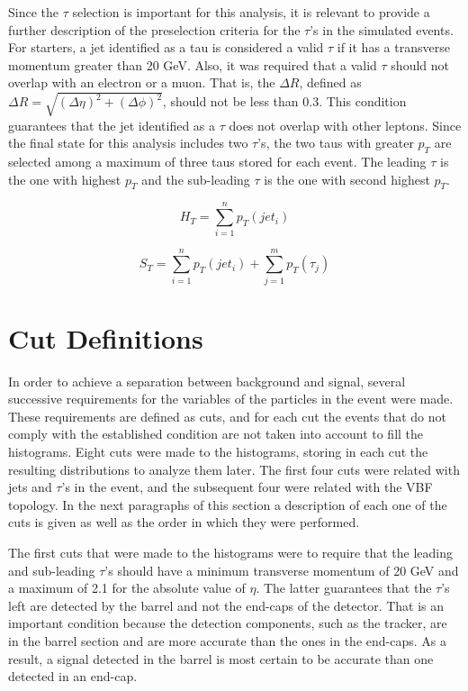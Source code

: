 Since the $\tau$ selection is important for this analysis, it is relevant to provide a further description of the preselection criteria for the $\tau$'s in the simulated events. For starters, a jet identified as a tau is considered a valid $\tau$ if it has a transverse momentum greater than 20 GeV. Also, it was required that a valid $\tau$ should not overlap with an electron or a muon. That is, the $\Delta R$, defined as $\Delta R = \sqrt{(\Delta \eta)^2 + (\Delta \phi)^2}$, should not be less than 0.3. This condition guarantees that the jet identified as a $\tau$ does not overlap with other leptons. Since the final state for this analysis includes two $\tau$'s, the two taus with greater $p_{T}$ are selected among a maximum of three taus stored for each event. The leading $\tau$ is the one with highest $p_{T}$ and the sub-leading $\tau$ is the one with second highest $p_{T}$.

\begin{equation}
 H_{T} = \sum_{i=1}^{n} p_{T}(jet_{i})
 \label{eq: HT}
\end{equation}

\begin{equation}
 S_{T} = \sum_{i=1}^{n} p_{T}(jet_{i}) + \sum_{j=1}^{m} p_{T}(\tau_{j})
 \label{eq: ST}
\end{equation}



\section{Cut Definitions} \label{sec: cutdefinitions}

In order to achieve a separation between background and signal, several successive requirements for the variables of the particles in the event were made. These requirements are defined as cuts, and for each cut the events that do not comply with the established condition are not taken into account to fill the histograms. Eight cuts were made to the histograms, storing in each cut the resulting distributions to analyze them later. The first four cuts were related with jets and $\tau$'s in the event, and the subsequent four were related with the VBF topology. In the next paragraphs of this section a description of each one of the cuts is given as well as the order in which they were performed.

The first cuts that were made to the histograms were to require that the leading and sub-leading $\tau$'s should have a minimum transverse momentum of 20 GeV and a maximum of 2.1 for the absolute value of $\eta$. The latter guarantees that the $\tau$'s left are detected by the barrel and not the end-caps of the detector. That is an important condition because the detection components, such as the tracker, are in the barrel section and are more accurate than the ones in the end-caps. As a result, a signal detected in the barrel is most certain to be accurate than one detected in an end-cap.  

